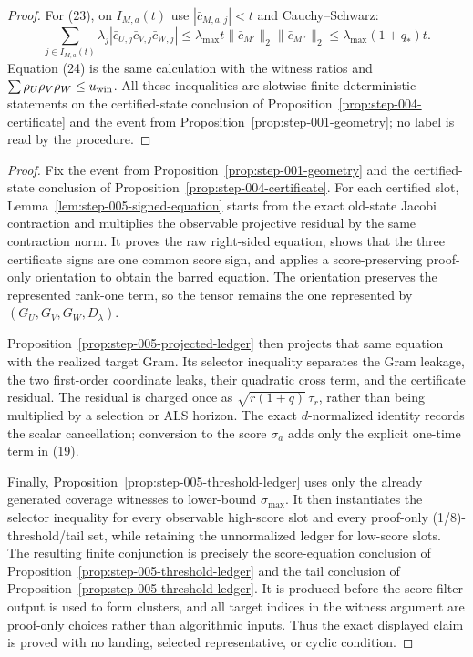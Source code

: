 \begin{proposition}
\begin{proof}
For (23), on $I_{M,a}(t)$ use $|\bar c_{M,a,j}|<t$ and Cauchy--Schwarz:
\[
\sum_{j\in I_{M,a}(t)}\lambda_j|\bar c_{U,j}\bar c_{V,j}\bar c_{W,j}|
\le\lambda_{\max}t\|\bar c_{M'}\|_2\|\bar c_{M''}\|_2
\le\lambda_{\max}(1+q_*)t.
\]
Equation (24) is the same calculation with the witness ratios and
$\sum\rho_U\rho_V\rho_W\le u_{\rm win}$. All these inequalities are
slotwise finite deterministic statements on the certified-state conclusion of Proposition~\ref{prop:step-004-certificate} and the event from Proposition~\ref{prop:step-001-geometry}; no label is
read by the procedure. 

\end{proof}
\end{proposition}
\begin{proof}
Fix the event from Proposition~\ref{prop:step-001-geometry} and the certified-state conclusion of Proposition~\ref{prop:step-004-certificate}.  For each certified slot,
Lemma~\ref{lem:step-005-signed-equation} starts from the exact old-state
Jacobi contraction and multiplies the observable projective residual by the
same contraction norm.  It proves the raw right-sided equation, shows that
the three certificate signs are one common score sign, and applies a
score-preserving proof-only orientation to obtain the barred equation.  The
orientation preserves the represented rank-one term, so the tensor remains
the one represented by $(G_U,G_V,G_W,D_\lambda)$.

Proposition~\ref{prop:step-005-projected-ledger} then projects that same
equation with the realized target Gram.  Its selector inequality separates
the Gram leakage, the two first-order coordinate leaks, their quadratic cross
term, and the certificate residual. The residual is charged once as
$\sqrt{r(1+q)}\,\tau_r$, rather than being multiplied by a selection or ALS
horizon. The exact $d$-normalized identity records the scalar cancellation;
conversion to the score $\sigma_a$ adds only the
explicit one-time term in (19).

Finally, Proposition~\ref{prop:step-005-threshold-ledger} uses only the
already generated coverage witnesses to lower-bound $\sigma_{\max}$. It
then instantiates the selector inequality for every observable high-score
slot and every proof-only (1/8)-threshold/tail set, while retaining the unnormalized
ledger for low-score slots.  The resulting finite conjunction is precisely
the score-equation conclusion of Proposition~\ref{prop:step-005-threshold-ledger} and the tail conclusion of Proposition~\ref{prop:step-005-threshold-ledger}.  It is produced before the score-filter output
is used to form clusters, and all target indices in the witness argument are
proof-only choices rather than algorithmic inputs.  Thus the exact displayed
claim is proved with no landing, selected representative, or cyclic
condition.
\end{proof}

